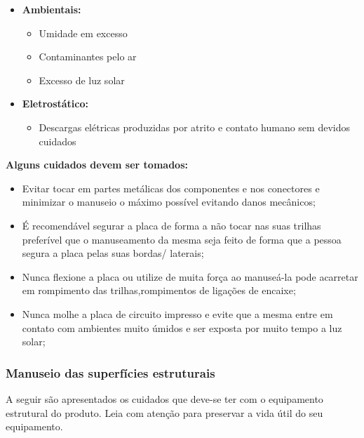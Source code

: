 \begin{itemize}
\item \textbf{Ambientais:}
\begin{itemize}
\item Umidade em excesso
\item Contaminantes pelo ar 
\item Excesso de luz solar
\end{itemize}
\end{itemize}

\begin{itemize}
\item \textbf{Eletrostático:}
\begin{itemize}
\item Descargas elétricas produzidas por atrito e contato humano sem devidos cuidados
\end{itemize}
\end{itemize}

\par {\textbf{Alguns cuidados devem ser tomados:}}

\begin{itemize}
\item Evitar tocar em partes metálicas dos componentes e nos conectores e minimizar o manuseio o máximo possível evitando danos mecânicos;
\item É recomendável segurar a placa de forma a não tocar nas suas trilhas preferível que o manuseamento da mesma seja feito de forma que a pessoa segura a placa pelas suas bordas/ laterais;  
\item Nunca flexione a placa ou utilize de muita força ao manuseá-la pode acarretar em rompimento das trilhas,rompimentos de ligações  de encaixe;
\item Nunca molhe a placa de circuito impresso e evite que a mesma entre em contato com ambientes muito úmidos e ser exposta por muito tempo a luz solar;
\end{itemize}

\subsubsection*{Manuseio das superfícies estruturais}

\par A seguir são apresentados os cuidados que deve-se ter com o equipamento estrutural do produto. Leia com atenção para preservar a vida útil do seu equipamento.

